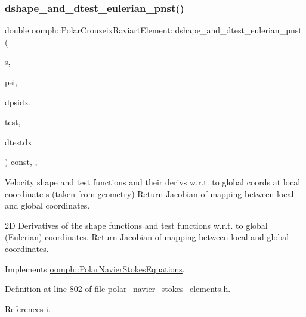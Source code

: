 \subsubsection{\texorpdfstring{dshape\+\_\+and\+\_\+dtest\+\_\+eulerian\+\_\+pnst()}{dshape\_and\_dtest\_eulerian\_pnst()}}
{\footnotesize\ttfamily double oomph\+::\+Polar\+Crouzeix\+Raviart\+Element\+::dshape\+\_\+and\+\_\+dtest\+\_\+eulerian\+\_\+pnst (\begin{DoxyParamCaption}\item[{const \hyperlink{classoomph_1_1Vector}{Vector}$<$ double $>$ \&}]{s,  }\item[{\hyperlink{classoomph_1_1Shape}{Shape} \&}]{psi,  }\item[{\hyperlink{classoomph_1_1DShape}{D\+Shape} \&}]{dpsidx,  }\item[{\hyperlink{classoomph_1_1Shape}{Shape} \&}]{test,  }\item[{\hyperlink{classoomph_1_1DShape}{D\+Shape} \&}]{dtestdx }\end{DoxyParamCaption}) const\hspace{0.3cm}{\ttfamily [inline]}, {\ttfamily [protected]}, {\ttfamily [virtual]}}



Velocity shape and test functions and their derivs w.\+r.\+t. to global coords at local coordinate s (taken from geometry) Return Jacobian of mapping between local and global coordinates. 

2D Derivatives of the shape functions and test functions w.\+r.\+t. to global (Eulerian) coordinates. Return Jacobian of mapping between local and global coordinates. 

Implements \hyperlink{classoomph_1_1PolarNavierStokesEquations_a5be752caefa4421e221aaccd4712ec11}{oomph\+::\+Polar\+Navier\+Stokes\+Equations}.



Definition at line 802 of file polar\+\_\+navier\+\_\+stokes\+\_\+elements.\+h.



References i.

\mbox{\label{classoomph_1_1PolarCrouzeixRaviartElement_a10ce59c8e1796c0fcac9c0b3b6a89568}} 
